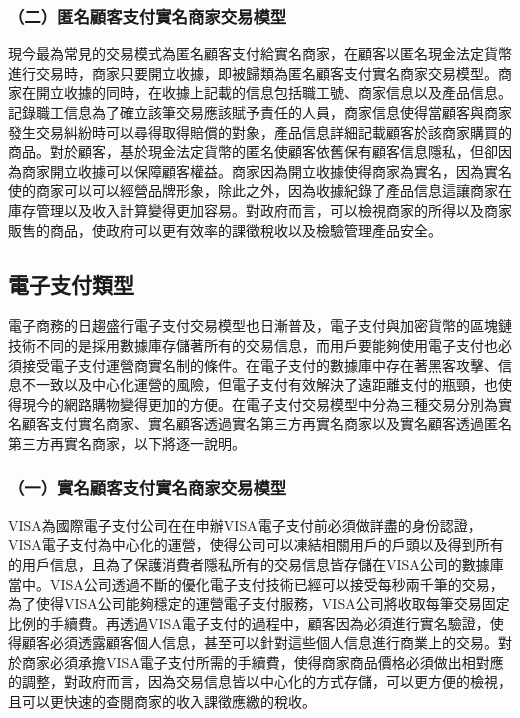 		\subsubsection{（二）匿名顧客支付實名商家交易模型}
		現今最為常見的交易模式為匿名顧客支付給實名商家，在顧客以匿名現金法定貨幣進行交易時，商家只要開立收據，即被歸類為匿名顧客支付實名商家交易模型。商家在開立收據的同時，在收據上記載的信息包括職工號、商家信息以及產品信息。記錄職工信息為了確立該筆交易應該賦予責任的人員，商家信息使得當顧客與商家發生交易糾紛時可以尋得取得賠償的對象，產品信息詳細記載顧客於該商家購買的商品。對於顧客，基於現金法定貨幣的匿名使顧客依舊保有顧客信息隱私，但卻因為商家開立收據可以保障顧客權益。商家因為開立收據使得商家為實名，因為實名使的商家可以可以經營品牌形象，除此之外，因為收據紀錄了產品信息這讓商家在庫存管理以及收入計算變得更加容易。對政府而言，可以檢視商家的所得以及商家販售的商品，使政府可以更有效率的課徵稅收以及檢驗管理產品安全。

	\subsection{電子支付類型}
	電子商務的日趨盛行電子支付交易模型也日漸普及，電子支付與加密貨幣的區塊鏈技術不同的是採用數據庫存儲著所有的交易信息，而用戶要能夠使用電子支付也必須接受電子支付運營商實名制的條件。在電子支付的數據庫中存在著黑客攻擊、信息不一致以及中心化運營的風險，但電子支付有效解決了遠距離支付的瓶頸，也使得現今的網路購物變得更加的方便。在電子支付交易模型中分為三種交易分別為實名顧客支付實名商家、實名顧客透過實名第三方再實名商家以及實名顧客透過匿名第三方再實名商家，以下將逐一說明。

		\subsubsection{（一）實名顧客支付實名商家交易模型}
		VISA為國際電子支付公司在在申辦VISA電子支付前必須做詳盡的身份認證，VISA電子支付為中心化的運營，使得公司可以凍結相關用戶的戶頭以及得到所有的用戶信息，且為了保護消費者隱私所有的交易信息皆存儲在VISA公司的數據庫當中。VISA公司透過不斷的優化電子支付技術已經可以接受每秒兩千筆的交易，為了使得VISA公司能夠穩定的運營電子支付服務，VISA公司將收取每筆交易固定比例的手續費。再透過VISA電子支付的過程中，顧客因為必須進行實名驗證，使得顧客必須透露顧客個人信息，甚至可以針對這些個人信息進行商業上的交易。對於商家必須承擔VISA電子支付所需的手續費，使得商家商品價格必須做出相對應的調整，對政府而言，因為交易信息皆以中心化的方式存儲，可以更方便的檢視，且可以更快速的查閱商家的收入課徵應繳的稅收。
		

